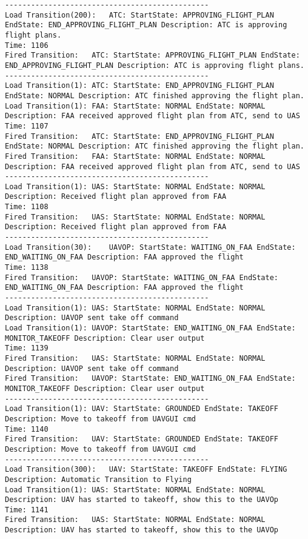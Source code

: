 \begin{spacing}{1}
\begin{verbatim}
-----------------------------------------------
Load Transition(200):	ATC: StartState: APPROVING_FLIGHT_PLAN EndState: END_APPROVING_FLIGHT_PLAN Description: ATC is approving flight plans.
Time: 1106
Fired Transition:	ATC: StartState: APPROVING_FLIGHT_PLAN EndState: END_APPROVING_FLIGHT_PLAN Description: ATC is approving flight plans.
-----------------------------------------------
Load Transition(1):	ATC: StartState: END_APPROVING_FLIGHT_PLAN EndState: NORMAL Description: ATC finished approving the flight plan.
Load Transition(1):	FAA: StartState: NORMAL EndState: NORMAL Description: FAA received approved flight plan from ATC, send to UAS
Time: 1107
Fired Transition:	ATC: StartState: END_APPROVING_FLIGHT_PLAN EndState: NORMAL Description: ATC finished approving the flight plan.
Fired Transition:	FAA: StartState: NORMAL EndState: NORMAL Description: FAA received approved flight plan from ATC, send to UAS
-----------------------------------------------
Load Transition(1):	UAS: StartState: NORMAL EndState: NORMAL Description: Received flight plan approved from FAA
Time: 1108
Fired Transition:	UAS: StartState: NORMAL EndState: NORMAL Description: Received flight plan approved from FAA
-----------------------------------------------
Load Transition(30):	UAVOP: StartState: WAITING_ON_FAA EndState: END_WAITING_ON_FAA Description: FAA approved the flight
Time: 1138
Fired Transition:	UAVOP: StartState: WAITING_ON_FAA EndState: END_WAITING_ON_FAA Description: FAA approved the flight
-----------------------------------------------
Load Transition(1):	UAS: StartState: NORMAL EndState: NORMAL Description: UAVOP sent take off command
Load Transition(1):	UAVOP: StartState: END_WAITING_ON_FAA EndState: MONITOR_TAKEOFF Description: Clear user output
Time: 1139
Fired Transition:	UAS: StartState: NORMAL EndState: NORMAL Description: UAVOP sent take off command
Fired Transition:	UAVOP: StartState: END_WAITING_ON_FAA EndState: MONITOR_TAKEOFF Description: Clear user output
-----------------------------------------------
Load Transition(1):	UAV: StartState: GROUNDED EndState: TAKEOFF Description: Move to takeoff from UAVGUI cmd
Time: 1140
Fired Transition:	UAV: StartState: GROUNDED EndState: TAKEOFF Description: Move to takeoff from UAVGUI cmd
-----------------------------------------------
Load Transition(300):	UAV: StartState: TAKEOFF EndState: FLYING Description: Automatic Transition to Flying
Load Transition(1):	UAS: StartState: NORMAL EndState: NORMAL Description: UAV has started to takeoff, show this to the UAVOp
Time: 1141
Fired Transition:	UAS: StartState: NORMAL EndState: NORMAL Description: UAV has started to takeoff, show this to the UAVOp

\end{verbatim}
\end{spacing}
